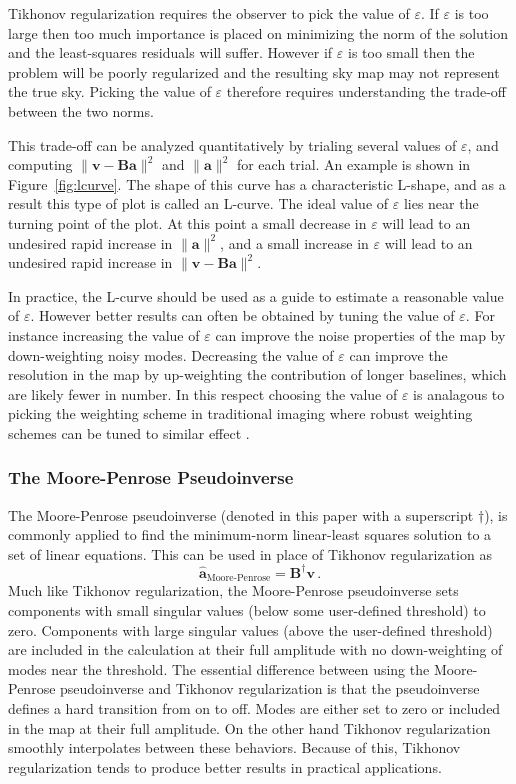 \documentclass[twocolumn]{aastex61}
\renewcommand{\b}{\pmb}
\begin{document}
Tikhonov regularization requires the observer to pick the value of $\varepsilon$. If $\varepsilon$
is too large then too much importance is placed on minimizing the norm of the solution and the
least-squares residuals will suffer. However if $\varepsilon$ is too small then the problem will be
poorly regularized and the resulting sky map may not represent the true sky. Picking the value of
$\varepsilon$ therefore requires understanding the trade-off between the two norms.

This trade-off can be analyzed quantitatively by trialing several values of $\varepsilon$, and
computing $\|\b v - \b B\b a\|^2$ and $\|\b a\|^2$ for each trial. An example is shown in
Figure~\ref{fig:lcurve}. The shape of this curve has a characteristic L-shape, and as a result this
type of plot is called an L-curve. The ideal value of $\varepsilon$ lies near the turning point of
the plot. At this point a small decrease in $\varepsilon$ will lead to an undesired rapid increase
in $\|\b a\|^2$, and a small increase in $\varepsilon$ will lead to an undesired rapid increase in
$\|\b v - \b B\b a\|^2$.

In practice, the L-curve should be used as a guide to estimate a reasonable value of $\varepsilon$.
However better results can often be obtained by tuning the value of $\varepsilon$. For instance
increasing the value of $\varepsilon$ can improve the noise properties of the map by down-weighting
noisy modes. Decreasing the value of $\varepsilon$ can improve the resolution in the map by
up-weighting the contribution of longer baselines, which are likely fewer in number. In this respect
choosing the value of $\varepsilon$ is analagous to picking the weighting scheme in traditional
imaging where robust weighting schemes can be tuned to similar effect \citep{briggs}.

\subsubsection{The Moore-Penrose Pseudoinverse}

The Moore-Penrose pseudoinverse (denoted in this paper with a superscript $\dagger$), is commonly
applied to find the minimum-norm linear-least squares solution to a set of linear equations. This
can be used in place of Tikhonov regularization as
\begin{equation}
    \b{\hat a}_\text{Moore-Penrose} = \b B^\dagger\b v\,.
\end{equation}
Much like Tikhonov regularization, the Moore-Penrose pseudoinverse sets components with small
singular values (below some user-defined threshold) to zero. Components with large singular values
(above the user-defined threshold) are included in the calculation at their full amplitude with no
down-weighting of modes near the threshold. The essential difference between using the Moore-Penrose
pseudoinverse and Tikhonov regularization is that the pseudoinverse defines a hard transition from
on to off. Modes are either set to zero or included in the map at their full amplitude. On the other
hand Tikhonov regularization smoothly interpolates between these behaviors. Because of this,
Tikhonov regularization tends to produce better results in practical applications.
\end{document}
